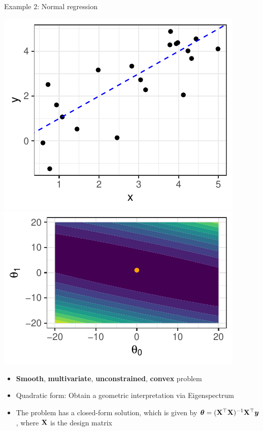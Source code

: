 \begin{vbframe}{Example 2: Normal regression}

\begin{center}
	\includegraphics[height=0.30\textwidth, keepaspectratio]{figure_man/ml_linreg_example_1.pdf} ~~ \includegraphics[height=0.30\textwidth, keepaspectratio]{figure_man/ml_linreg_example_2.pdf}
\end{center}

\begin{itemize}
	\item \textbf{Smooth}, \textbf{multivariate}, \textbf{unconstrained}, \textbf{convex} problem
	\item Quadratic form: Obtain a geometric interpretation via Eigenspectrum
	\item The problem has a closed-form solution, which is given by $\bm{\theta} = (\mathbf{X}^\top \mathbf{X})^{-1}\mathbf{X}^\top \bm{y}$, where $\mathbf{X}$ is the design matrix
\end{itemize}

\end{vbframe}

